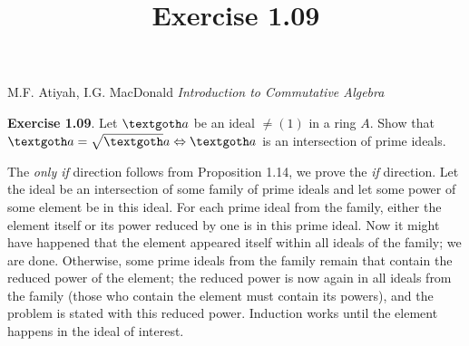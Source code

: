 \documentclass{article}
\title{Exercise 1.09}
\begin{document}
\maketitle

\begin{center}
M.F. Atiyah, I.G. MacDonald \emph{Introduction to Commutative Algebra}
\end{center}

\vspace*{10px} 

\textbf{Exercise 1.09}. Let $\textgoth a$ be an ideal $ \neq (1) $ in a ring $A$. Show that $ \textgoth a = \sqrt \textgoth a \Leftrightarrow \textgoth a $ is an intersection of prime ideals. 

\vspace*{10px} 

The \emph{only if} direction follows from Proposition 1.14, we prove the \emph{if} direction. Let the ideal be an intersection of some family of prime ideals and let some power of some element be in this ideal. For each prime ideal from the family, either the element itself or its power reduced by one is in this prime ideal. Now it might have happened that the element appeared itself within all ideals of the family; we are done. Otherwise, some prime ideals from the family remain that contain the reduced power of the element; the reduced power is now again in all ideals from the family (those who contain the element must contain its powers), and the problem is stated with this reduced power. Induction works until the element happens in the ideal of interest.
 
\end{document}
